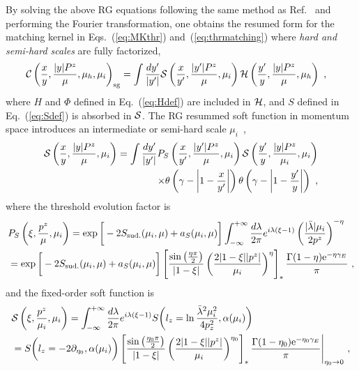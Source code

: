 \documentclass[a4paper,11pt]{article}
\begin{document}
By solving the above RG equations following the same method as Ref.~\cite{Becher:2006mr} and performing the Fourier transformation, one obtains the resumed form for the matching kernel in Eqs.~(\ref{eq:MKthr}) and~(\ref{eq:thrmatching}) where {\it hard and semi-hard scales} are fully factorized,
\begin{align}\label{eq:resummedform}
&  {\cal C}\left(\frac{x}{y},\frac{|y| P^z}{\mu},\mu_h,\mu_i\right)_{\rm sg}= \int \frac{d y'}{|y'|}   {\cal S}\left( \frac{x}{y'},\frac{|y'|P^z}{\mu},\mu_i\right)    {\cal H}\left( \frac{y'}{y},\frac{|y|P^z}{\mu},\mu_h\right) \ ,
\end{align}
where $H$ and $\Phi$ defined in Eq.~(\ref{eq:Hdef}) are included in ${\cal H}$, and $S$ defined in Eq.~(\ref{eq:Sdef}) is absorbed in ${\cal S}$. The RG resummed soft function in momentum space introduces an intermediate or semi-hard scale $\mu_i$~\cite{Becher:2006mr}, 
\begin{align}\label{eq:Jmom}
{\cal S}\left( \frac{x}{y},\frac{|y|P^z}{\mu},\mu_i\right)
= \int \frac{d y'}{|y'|} P_{S}\left(\frac{x}{y'},\frac{|y'|P^z}{\mu},\mu_i\right) {\cal S}\left( \frac{y'}{y},\frac{|y|P^z}{\mu_i},\mu_i\right) \nonumber\\
\times \theta\left(\gamma-\left|1-\frac{x}{y'}\right|\right) \theta\left(\gamma-\left|1-\frac{y'}{y}\right|\right) \ ,
\end{align}
where the threshold evolution factor is
\begin{align}\label{eq:TRevo}
&P_{S}\left(\xi,\frac{p^z}{\mu},\mu_i\right)
= \exp \bigg[-2   S_{\rm sud.}(\mu_i,\mu)+   a_{S}(\mu_i,\mu)\bigg] \int_{-\infty}^{+\infty} \frac{d\lambda}{2\pi} e^{i \lambda (\xi - 1)} \left( \frac{|\bar{\lambda}|\mu_i}{2 p^z} \right)^{-\eta} \nonumber\\
&=\exp \bigg[-2   S_{\rm sud.}(\mu_i,\mu) +   a_{S}(\mu_i,\mu)\bigg] \left[\frac{\sin \left(\frac{  \eta \pi}{2}\right)}{|1-\xi|}\left(\frac{2|1-\xi||p^z|}{\mu_i}\right)^{\eta}\right]_{*} \frac{ \Gamma(1-\eta) \mathrm{e}^{-\eta \gamma_E}}{\pi} \ ,
\end{align}
and the fixed-order soft function is
\begin{align}\label{eq:sffixed}
&{\cal S}\left( \xi,\frac{p^z}{\mu_i},\mu_i\right) = \int_{-\infty}^{+\infty} \frac{d\lambda}{2\pi} e^{i \lambda (\xi - 1)}  S\bigg(l_z=\ln \frac{\bar{\lambda}^2 \mu_i^2 }{4 p_z^2},\alpha(\mu_i)\bigg) \nonumber\\
& =  S\bigg(l_z=-2\partial_{\eta_0},\alpha(\mu_i)\bigg) \left[\frac{\sin \left(\frac{  \eta_0 \pi}{2}\right)}{|1-\xi|}\left(\frac{2|1-\xi||p^z|}{\mu_i}\right)^{\eta_0}\right]_{*} \frac{ \Gamma(1-\eta_0) \mathrm{e}^{-\eta_0 \gamma_E}}{\pi} \Bigg|_{\eta_0 \rightarrow 0} \ ,
\end{align}
\end{document}
